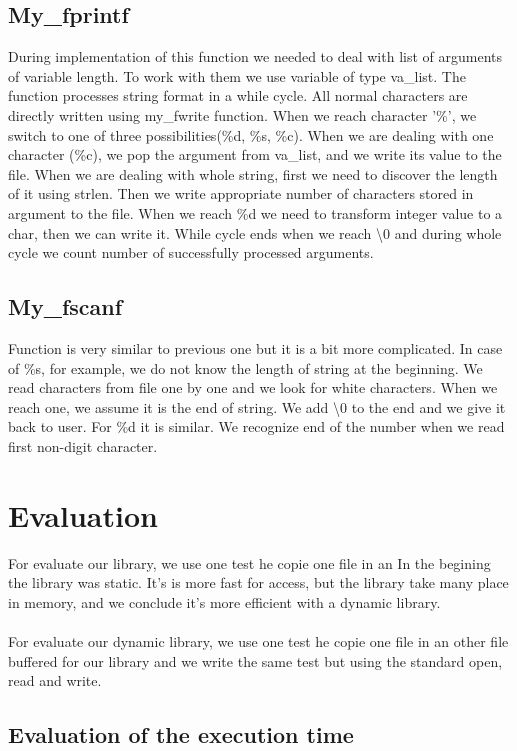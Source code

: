 \documentclass[a4paper,10pt]{article}
\begin{document}
\subsection{My\_fprintf}
During implementation of this function we needed to deal with list of arguments of variable length. To work with them we use variable of type va\_list. The function processes string format in a while cycle. All normal characters are directly written using my\_fwrite function. When we reach character '\%', we switch to one of three possibilities(\%d, \%s, \%c). When we are dealing with one character (\%c), we pop the argument from va\_list, and we write its value to the file. When we are dealing with whole string, first we need to discover the length of it using strlen. Then we write appropriate number of characters stored in argument to the file. When we reach \%d we need to transform integer value to a char, then we can write it. While cycle ends when we reach \textbackslash 0 and during whole cycle we count number of successfully processed arguments.
\subsection{My\_fscanf}
Function is very similar to previous one but it is a bit more complicated. In case of \%s, for example, we do not know the length of string at the beginning. We read characters from file one by one and we look for white characters. When we reach one, we assume it is the end of string. We add \textbackslash 0 to the end and we give it back to user. For \%d it is similar. We recognize end of the number when we read first non-digit character.

\section{Evaluation}
For evaluate our library, we use one test he copie one file in an
In the begining the library was static. It's is more fast for access, but 
the library take many place in memory, and we conclude it's more efficient
with a dynamic library. 
\paragraph{}
For evaluate our dynamic library, we use one test he copie one file in an
 other file buffered for our library and we write the same test 
 but using the standard open, read and write.
\subsection{Evaluation of the execution time}
\end{document}
